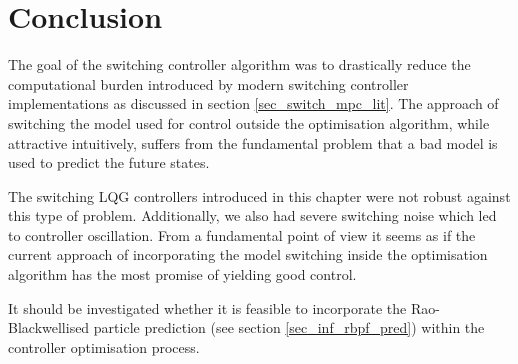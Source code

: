 \section{Conclusion}
The goal of the switching controller algorithm was to drastically reduce the computational burden introduced by modern switching controller implementations as discussed in section \ref{sec_switch_mpc_lit}. The approach of switching the model used for control outside the optimisation algorithm, while attractive intuitively, suffers from the fundamental problem that a bad model is used to predict the future states.

The switching LQG controllers introduced in this chapter were not robust against this type of problem. Additionally, we also had severe switching noise which led to controller oscillation. From a fundamental point of view it seems as if the current approach of incorporating the model switching inside the optimisation algorithm has the most promise of yielding good control. 

It should be investigated whether it is feasible to incorporate the Rao-Blackwellised particle prediction (see section \ref{sec_inf_rbpf_pred}) within the controller optimisation process.  